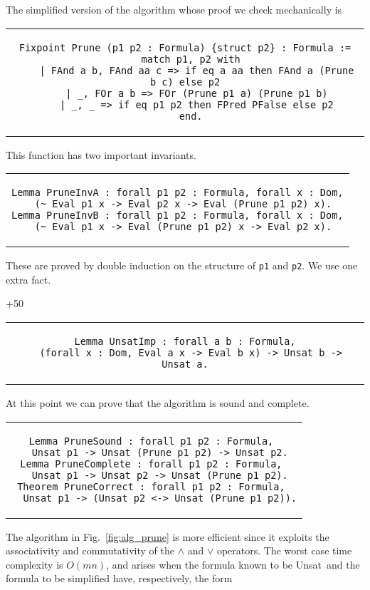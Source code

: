 \documentclass{llncs}
\def\lstinlinen{\lstinline[basicstyle=\normalsize\sffamily]}
\def\unsat{{\sc Unsat}}
\begin{document}
\noindent
The simplified version of the algorithm whose proof we check
mechanically is

\begin{tabular}{c}
\begin{lstlisting}
Fixpoint Prune (p1 p2 : Formula) {struct p2} : Formula :=
  match p1, p2 with
    | FAnd a b, FAnd aa c => if eq a aa then FAnd a (Prune b c) else p2
    | _, FOr a b => FOr (Prune p1 a) (Prune p1 b)
    | _, _ => if eq p1 p2 then FPred PFalse else p2
  end.
\end{lstlisting}
\end{tabular}

\noindent
This function has two important invariants.

\begin{tabular}{c}
\begin{lstlisting}
Lemma PruneInvA : forall p1 p2 : Formula, forall x : Dom,
  (~ Eval p1 x -> Eval p2 x -> Eval (Prune p1 p2) x).
Lemma PruneInvB : forall p1 p2 : Formula, forall x : Dom,
  (~ Eval p1 x -> Eval (Prune p1 p2) x -> Eval p2 x).
\end{lstlisting}
\end{tabular}

\noindent
These are proved by double induction on the structure of 
\lstinlinen|p1| and \lstinlinen|p2|. We use one extra 
fact.

\penalty+50

\begin{tabular}{c}
\begin{lstlisting}
Lemma UnsatImp : forall a b : Formula,
  (forall x : Dom, Eval a x -> Eval b x) -> Unsat b -> Unsat a.
\end{lstlisting}
\end{tabular}

\noindent
At this point we can prove that the algorithm 
is sound and complete.

\begin{tabular}{c}
\begin{lstlisting}
Lemma PruneSound : forall p1 p2 : Formula, 
  Unsat p1 -> Unsat (Prune p1 p2) -> Unsat p2.
Lemma PruneComplete : forall p1 p2 : Formula, 
  Unsat p1 -> Unsat p2 -> Unsat (Prune p1 p2).
Theorem PruneCorrect : forall p1 p2 : Formula, 
  Unsat p1 -> (Unsat p2 <-> Unsat (Prune p1 p2)).
\end{lstlisting}
\end{tabular}

The algorithm in Fig.~\ref{fig:alg_prune} is more efficient
since it exploits the associativity and commutativity of the 
$\land$ and $\lor$ operators. The worst case time complexity 
is $O(mn)$, and arises when the formula known to be \unsat\
and the formula to be simplified have, respectively, the form
\end{document}

